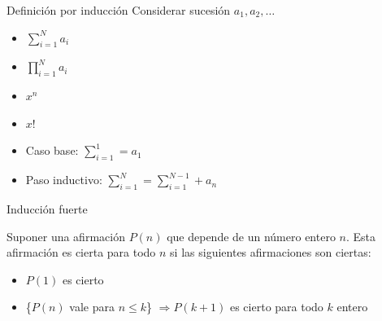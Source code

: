 \documentclass[14pt,aspectratio=169,xcolor=dvipsnames]{beamer}
\begin{document}
\begin{frame}{Definición por inducción}
    Considerar sucesión $a_1, a_2, \hdots$
    \begin{itemize}
        \item  $\sum_{i=1}^N a_i$
        \item $ \prod_{i=1}^N a_i$
        \item $x^n$
        \item $x!$
    \end{itemize}
    \pause
    \begin{center}
    \begin{minipage}{0.6\textwidth}
    \begin{block}{}
        \begin{itemize}
            \item Caso base: $\sum_{i=1}^1 = a_1$
            \item Paso inductivo: $\sum_{i=1}^N = \sum_{i=1}^{N-1} + a_n$
        \end{itemize}
    \end{block}
    \end{minipage}
    \end{center}
\end{frame}
\begin{frame}{Inducción fuerte}
    \begin{block}{}
        Suponer una afirmación $P(n)$ que depende de un número entero $n$. Esta afirmación es cierta para todo $n$ si las siguientes afirmaciones son ciertas:
        \begin{itemize}
            \item $P(1)$ es cierto 
            \item \{$P(n)$ vale para $n\leq k$\} $\Rightarrow P(k+1)$ es cierto para todo $k$ entero
        \end{itemize}
    \end{block}

\end{frame}
\begin{frame}
\end{frame}
\begin{frame}
\end{frame}
\begin{frame}
    \maketitle
\end{frame}
\end{document}
